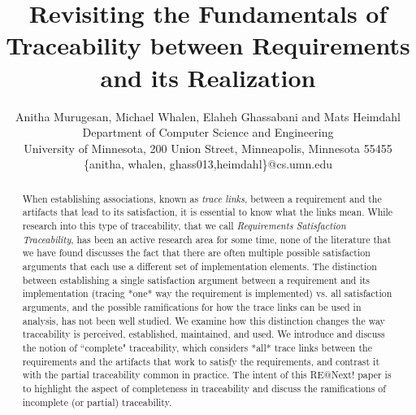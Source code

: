 \documentclass{IEEEtran}
\begin{document}
    \newcommand{\mike}[1]{\textcolor{green}{\emph {Mike: #1}}}
    \newcommand{\mats}[1]{\textcolor{blue}{\sc Mats: #1}}
    \newcommand{\sanjai}[1]{\textcolor{magenta}{\sc Sanjai: #1}}
    \newcommand{\anitha}[1]{\textcolor{red}{\emph {Anitha: #1}}}
    \newcommand{\req}[1]{\textcolor{blue}{\begin{quotation}\emph{#1}\end{quotation}}} %
    \newcommand{\eq}[1]{\textcolor{blue}{\begin{equation} #1\end{equation}}}
    \sloppypar


\title{Revisiting the Fundamentals of Traceability between Requirements and its Realization}

\author{Anitha Murugesan, Michael Whalen, Elaheh Ghassabani and Mats Heimdahl \\
      {Department of Computer Science and Engineering}\\
      {University of Minnesota, 200 Union Street, Minneapolis, Minnesota 55455}\\
      {\{anitha, whalen, ghass013,heimdahl\}@cs.umn.edu}
}

    \maketitle

    \begin{abstract}
When establishing associations, known as \emph{ trace links}, between a requirement
and the artifacts that lead to its satisfaction, it is essential to know what the links mean.
While research into this type of
traceability, that we call \emph{Requirements Satisfaction Traceability},
 has been an active research area for some time, none of the
literature that we have found discusses the fact that there are often multiple possible
satisfaction arguments that each use a different set of implementation elements.
The distinction between establishing a single satisfaction argument
between a requirement and its implementation (tracing *one* way the requirement is implemented) vs. all satisfaction arguments, and the possible ramifications for how the trace
links can be used in analysis, has not been well studied.  We examine how this distinction
changes the way traceability is perceived, established, maintained, and used.  We introduce
and discuss the notion of ``complete" traceability, which considers *all* trace
links between the requirements and the artifacts that work to satisfy the
requirements, and contrast it with the partial traceability common in
practice.  The intent of this RE@Next! paper is to highlight the aspect of
completeness in traceability and discuss the ramifications of incomplete (or
partial) traceability.
%    
    \end{abstract}

    
    
    
    
%    
%    
    

%    
%    

%



\end{document}

